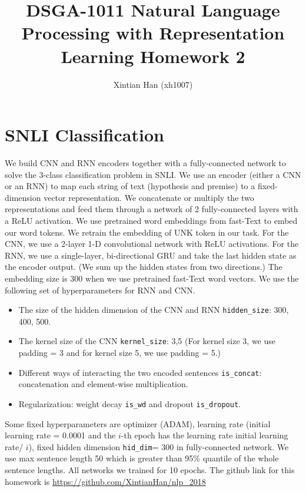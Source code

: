 \documentclass[10pt,a4paper]{article}
\title{DSGA-1011 Natural Language Processing with Representation Learning Homework 2
}
\author{Xintian Han (xh1007)}
\begin{document}
\maketitle
\section{SNLI Classification} 
We build CNN and RNN encoders together with a fully-connected network to solve the 3-class classification problem in SNLI. We use an encoder (either a CNN or an RNN) to map each string of text (hypothesis and premise) to a fixed-dimension vector representation. We concatenate or multiply the two representations and feed them through a network of 2 fully-connected layers with a ReLU activation. We use pretrained word embeddings from fast-Text to embed our word tokens. We retrain the embedding of UNK token in our task. For the CNN, we use a 2-layer 1-D convolutional network with ReLU activations. For the RNN, we use a single-layer, bi-directional GRU and take the last hidden state as the encoder output. (We sum up the hidden states from two directions.) The embedding size is 300 when we use pretrained fast-Text word vectors. We use the following set of hyperparameters for RNN and CNN.
\begin{itemize}
\item The size of the hidden dimension of the CNN and RNN \texttt{hidden\_size}: 300, 400, 500.
\item The kernel size of the CNN \texttt{kernel\_size}: 3,5 (For kernel size 3, we use padding = 3 and for kernel size 5, we use padding = 5.)
\item Different ways of interacting the two encoded sentences \texttt{is\_concat}: concatenation and element-wise multiplication.
\item Regularization: weight decay \texttt{is\_wd} and dropout \texttt{is\_dropout}.
\end{itemize}
Some fixed hyperparameters are optimizer (ADAM), learning rate (initial learning rate = 0.0001 and the $i$-th epoch has the learning rate initial learning rate/ $i$), fixed hidden dimension \texttt{hid\_dim}= 300 in fully-connected network. We use max sentence length 50 which is greater than 95\% quantile of the whole sentence lengths. All networks we trained for 10 epochs. The github link for this homework is \href{https://github.com/XintianHan/nlp_2018}{https://github.com/XintianHan/nlp\_2018}
\end{document}
